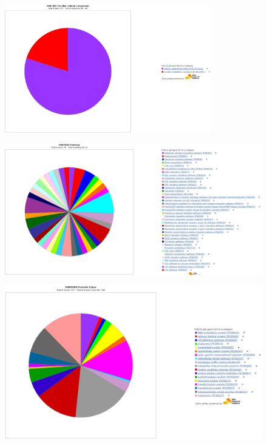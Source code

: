\documentclass[UTF8]{ctexart}
\begin{document}
\begin{figure}[h]
	\centering
	\includegraphics[width=0.8\textwidth]{img/GO_CelCom.png}
\end{figure}

\begin{figure}[h]
	\centering
	\includegraphics[width=\textwidth]{img/GO_Path.png}
\end{figure}

\begin{figure}[h]
	\centering
	\includegraphics[width=\textwidth]{img/GO_ProCla.png}
\end{figure}
\end{document}
